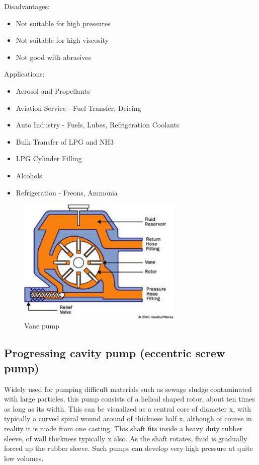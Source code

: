 \noindent Disadvantages:
\begin{itemize}
\item Not suitable for high pressures
\item Not suitable for high viscosity
\item Not good with abrasives
\end{itemize} 

\noindent Applications:
\begin{itemize}
\item Aerosol and Propellants
\item Aviation Service - Fuel Transfer, Deicing
\item Auto Industry - Fuels, Lubes, Refrigeration Coolants
\item Bulk Transfer of LPG and NH3
\item LPG Cylinder Filling
\item Alcohols
\item Refrigeration - Freons, Ammonia
\end{itemize}

\begin{figure}[ht]
\begin{center}
\includegraphics[height=6cm]{figs/vane_pump.jpg}
\caption{\label{fig:vane_pump} Vane pump}
\end{center}
\end{figure}


\subsection{Progressing cavity pump (eccentric screw pump)}

Widely used for pumping difficult materials such as sewage sludge contaminated with large particles, this pump consists of a helical shaped rotor, about ten times as long as its width. This can be visualized as a central core of diameter x, with typically a curved spiral wound around of thickness half x, although of course in reality it is made from one casting. This shaft fits inside a heavy duty rubber sleeve, of wall thickness typically x also. As the shaft rotates, fluid is gradually forced up the rubber sleeve. Such pumps can develop very high pressure at quite low volumes.

